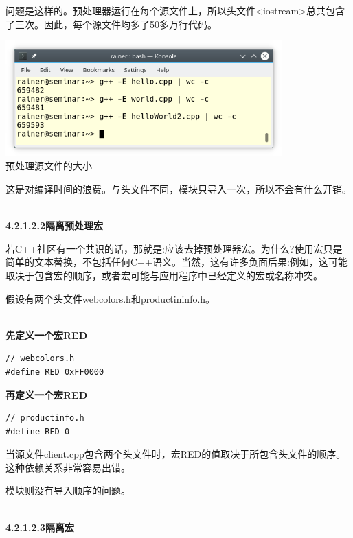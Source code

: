 问题是这样的。预处理器运行在每个源文件上，所以头文件<iostream>总共包含了三次。因此，每个源文件均多了50多万行代码。

\begin{center}
\includegraphics[width=0.8\textwidth]{content/3/chapter4/images/15.png}\\
预处理源文件的大小
\end{center}

这是对编译时间的浪费。与头文件不同，模块只导入一次，所以不会有什么开销。

\hspace*{\fill} \\ %
\noindent
\textbf{4.2.1.2.2\hspace{0.2cm}隔离预处理宏}

若C++社区有一个共识的话，那就是:应该去掉预处理器宏。为什么?使用宏只是简单的文本替换，不包括任何C++语义。当然，这有许多负面后果:例如，这可能取决于包含宏的顺序，或者宏可能与应用程序中已经定义的宏或名称冲突。

假设有两个头文件webcolors.h和productininfo.h。

\hspace*{\fill} \\ %
\noindent
\textbf{先定义一个宏RED}
\begin{lstlisting}[style=styleCXX]
// webcolors.h
#define RED 0xFF0000
\end{lstlisting}

\noindent
\textbf{再定义一个宏RED}
\begin{lstlisting}[style=styleCXX]
// productinfo.h
#define RED 0
\end{lstlisting}

当源文件client.cpp包含两个头文件时，宏RED的值取决于所包含头文件的顺序。这种依赖关系非常容易出错。

模块则没有导入顺序的问题。

\hspace*{\fill} \\ %
\noindent
\textbf{4.2.1.2.3\hspace{0.2cm}隔离宏}

